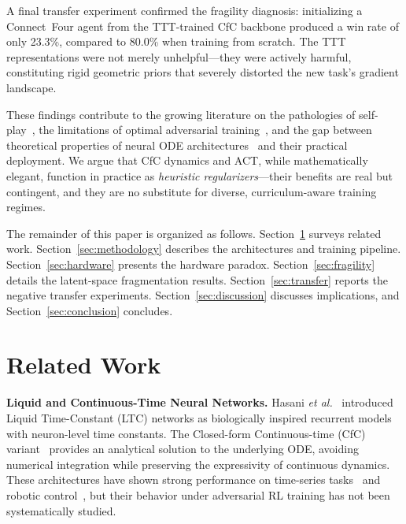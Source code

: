 \documentclass[conference]{IEEEtran}
\newcommand{\etal}{\textit{et al.}}
\begin{document}
A final transfer experiment confirmed the fragility diagnosis: initializing a Connect~Four agent from the TTT-trained CfC backbone produced a win rate of only 23.3\%, compared to 80.0\% when training from scratch. The TTT representations were not merely unhelpful---they were actively harmful, constituting rigid geometric priors that severely distorted the new task's gradient landscape.

These findings contribute to the growing literature on the pathologies of self-play~\cite{lanctot2017unified}, the limitations of optimal adversarial training~\cite{silver2018general}, and the gap between theoretical properties of neural ODE architectures~\cite{chen2018neural} and their practical deployment. We argue that CfC dynamics and ACT, while mathematically elegant, function in practice as \emph{heuristic regularizers}---their benefits are real but contingent, and they are no substitute for diverse, curriculum-aware training regimes.

The remainder of this paper is organized as follows. Section~\ref{sec:related} surveys related work. Section~\ref{sec:methodology} describes the architectures and training pipeline. Section~\ref{sec:hardware} presents the hardware paradox. Section~\ref{sec:fragility} details the latent-space fragmentation results. Section~\ref{sec:transfer} reports the negative transfer experiments. Section~\ref{sec:discussion} discusses implications, and Section~\ref{sec:conclusion} concludes.


\section{Related Work}
\label{sec:related}

\textbf{Liquid and Continuous-Time Neural Networks.}
Hasani \etal~\cite{hasani2021liquid} introduced Liquid Time-Constant (LTC) networks as biologically inspired recurrent models with neuron-level time constants. The Closed-form Continuous-time (CfC) variant~\cite{hasani2021closed} provides an analytical solution to the underlying ODE, avoiding numerical integration while preserving the expressivity of continuous dynamics. These architectures have shown strong performance on time-series tasks~\cite{hasani2022liquid} and robotic control~\cite{lechner2020neural}, but their behavior under adversarial RL training has not been systematically studied.
\end{document}
